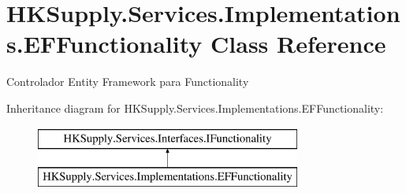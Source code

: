 \hypertarget{class_h_k_supply_1_1_services_1_1_implementations_1_1_e_f_functionality}{}\section{H\+K\+Supply.\+Services.\+Implementations.\+E\+F\+Functionality Class Reference}
\label{class_h_k_supply_1_1_services_1_1_implementations_1_1_e_f_functionality}


Controlador Entity Framework para Functionality  


Inheritance diagram for H\+K\+Supply.\+Services.\+Implementations.\+E\+F\+Functionality\+:\begin{figure}[H]
\begin{center}
\leavevmode
\includegraphics[height=2.000000cm]{class_h_k_supply_1_1_services_1_1_implementations_1_1_e_f_functionality}
\end{center}
\end{figure}
